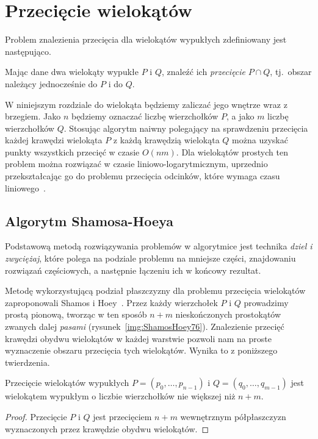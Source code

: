 \chapter{Przecięcie wielokątów}
Problem znalezienia przecięcia dla wielokątów wypukłych zdefiniowany
jest następująco.

\begin{problem}
  Mając dane dwa wielokąty wypukłe $P$ i $Q$, znaleźć ich
  \emph{przecięcie} $P \cap Q$, tj.\ obszar należący jednocześnie do
  $P$ i do $Q$.
\end{problem}

W niniejszym rozdziale do wielokąta będziemy zaliczać jego wnętrze
wraz z brzegiem. Jako $n$ będziemy oznaczać liczbę wierzchołków $P$, a
jako $m$ liczbę wierzchołków $Q$. Stosując algorytm naiwny polegający
na sprawdzeniu przecięcia każdej krawędzi wielokąta $P$ z każdą
krawędzią wielokąta $Q$ można uzyskać punkty wszystkich przecięć w
czasie $O(nm)$. Dla wielokątów prostych ten problem można rozwiązać w
czasie liniowo-logarytmicznym, uprzednio przekształcając go do
problemu przecięcia odcinków, które wymaga czasu
liniowego~\cite{Prep85}.

\section{Algorytm Shamosa-Hoeya}
Podstawową metodą rozwiązywania problemów w algorytmice jest technika
\emph{dziel i zwyciężaj}, które polega na podziale problemu na
mniejsze części, znajdowaniu rozwiązań częściowych, a następnie
łączeniu ich w końcowy rezultat.

Metodę wykorzystującą podział płaszczyzny dla problemu przecięcia
wielokątów zaproponowali Shamos i Hoey~\cite{ShamosHoey76}. Przez
każdy wierzchołek $P$ i $Q$ prowadzimy prostą pionową, tworząc w ten
sposób $n+m$ nieskończonych prostokątów zwanych dalej \emph{pasami}
(rysunek~\ref{img:ShamosHoey76}). Znalezienie przecięć krawędzi obydwu
wielokątów w każdej warstwie pozwoli nam na proste wyznaczenie obszaru
przecięcia tych wielokątów. Wynika to z poniższego twierdzenia.

\begin{twierdzenie}
  Przecięcie wielokątów wypukłych $P = (p_0, \ldots, p_{n-1})$ i $Q =
  (q_0, \ldots, q_{m-1})$ jest wielokątem wypukłym o liczbie
  wierzchołków nie większej niż $n + m$.
\end{twierdzenie}

\begin{proof}
  Przecięcie $P$ i $Q$ jest przecięciem $n + m$ wewnętrznym
  półpłaszczyzn wyznaczonych przez krawędzie obydwu wielokątów.
\end{proof}

